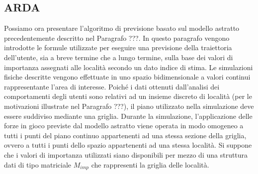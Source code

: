 \subsection{ARDA}
Possiamo ora presentare l'algoritmo di previsione basato sul modello astratto
precedentemente descritto nel Paragrafo ???. In questo paragrafo vengono
introdotte le formule utilizzate per eseguire una previsione della traiettoria
dell'utente, sia a breve termine che a lungo termine, sulla base dei valori di
importanza assegnati alle localit\`a secondo un dato indice di stima.
Le simulazioni fisiche descritte vengono effettuate in uno spazio bidimensionale
a valori continui rappresentante l'area di interesse. Poich\'e i dati ottenuti
dall'analisi dei comportamenti degli utenti sono relativi ad un insieme
discreto di localit\`a (per le motivazioni illustrate nel Paragrafo ???), il piano
utilizzato nella simulazione deve essere suddiviso mediante una griglia. Durante
la simulazione, l'applicazione delle forze in gioco previste dal modello
astratto viene operata in modo omogeneo a tutti i punti del piano continuo
appartenenti ad una stessa sezione della griglia, ovvero a tutti i punti dello
spazio appartenenti ad una stessa localit\`a.
Si suppone che i valori di importanza utilizzati siano disponibili per mezzo
di una struttura dati di tipo matriciale $M_{imp}$ che rappresenti la griglia delle
localit\`a.

